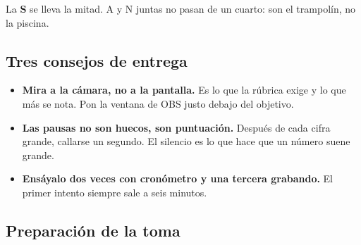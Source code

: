 \documentclass[11pt,a4paper]{article}
\begin{document}
\begin{center}
\end{center}

\noindent La \textbf{S} se lleva la mitad. A y N juntas no pasan de un cuarto:
son el trampolín, no la piscina.

\subsection{Tres consejos de entrega}

\begin{itemize}
  \item \textbf{Mira a la cámara, no a la pantalla.} Es lo que la rúbrica exige
        y lo que más se nota. Pon la ventana de OBS justo debajo del objetivo.
  \item \textbf{Las pausas no son huecos, son puntuación.} Después de cada cifra
        grande, callarse un segundo. El silencio es lo que hace que un número
        suene grande.
  \item \textbf{Ensáyalo dos veces con cronómetro y una tercera grabando.} El
        primer intento siempre sale a seis minutos.
\end{itemize}

\subsection{Preparación de la toma}
\end{document}
